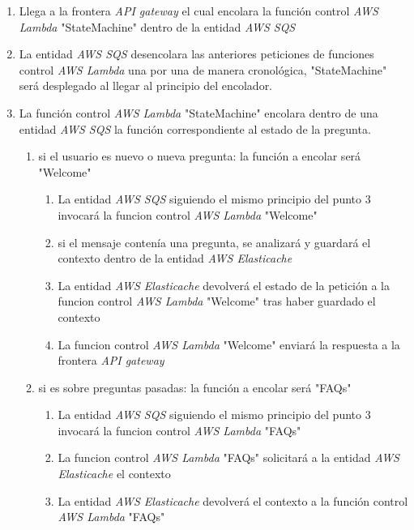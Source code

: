 \begin{enumerate}
\begin{enumerate}
\begin{enumerate}
                    \item Llega a la frontera \textit{API gateway} el cual encolara la función control \textit{AWS Lambda} "StateMachine" dentro de la entidad \textit{AWS SQS}
                    \item La entidad \textit{AWS SQS} desencolara las anteriores peticiones de funciones control \textit{AWS Lambda} una por una de manera cronológica, "StateMachine" será desplegado al llegar al principio del encolador.
                    \item La función control \textit{AWS Lambda} "StateMachine" encolara dentro de una entidad \textit{AWS SQS} la función correspondiente al estado de la pregunta.
                    \begin{enumerate}
                        \item si el usuario es nuevo o nueva pregunta: la función a encolar será "Welcome"
                        \begin{enumerate}
                            \item La entidad \textit{AWS SQS} siguiendo el mismo principio del punto 3 invocará la funcion control \textit{AWS Lambda} "Welcome"
                            \item si el mensaje contenía una pregunta, se analizará y guardará el contexto dentro de la entidad \textit{AWS Elasticache}
                            \item La entidad \textit{AWS Elasticache} devolverá el estado de la petición a la funcion control \textit{AWS Lambda} "Welcome" tras haber guardado el contexto
                            \item La funcion control \textit{AWS Lambda} "Welcome" enviará la respuesta a la frontera \textit{API gateway}
                        \end{enumerate}
                        \item si es sobre preguntas pasadas: la función a encolar será "FAQs"
                        \begin{enumerate}
                            \item La entidad \textit{AWS SQS} siguiendo el mismo principio del punto 3 invocará la funcion control \textit{AWS Lambda} "FAQs"
                            \item La funcion control \textit{AWS Lambda} "FAQs" solicitará a la entidad \textit{AWS Elasticache} el contexto
                            \item La entidad \textit{AWS Elasticache} devolverá el contexto a la función control \textit{AWS Lambda} "FAQs"

\end{enumerate}
\end{enumerate}
\end{enumerate}
\end{enumerate}
\end{enumerate}
